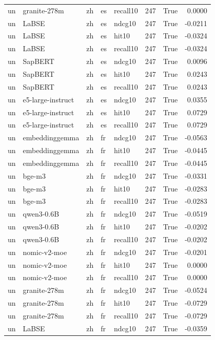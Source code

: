 \begin{tabular}{lllllrrr}
un & granite-278m & zh & es & recall10 & 247 & True & 0.0000 \\
un & LaBSE & zh & es & ndcg10 & 247 & True & -0.0211 \\
un & LaBSE & zh & es & hit10 & 247 & True & -0.0324 \\
un & LaBSE & zh & es & recall10 & 247 & True & -0.0324 \\
un & SapBERT & zh & es & ndcg10 & 247 & True & 0.0096 \\
un & SapBERT & zh & es & hit10 & 247 & True & 0.0243 \\
un & SapBERT & zh & es & recall10 & 247 & True & 0.0243 \\
un & e5-large-instruct & zh & es & ndcg10 & 247 & True & 0.0355 \\
un & e5-large-instruct & zh & es & hit10 & 247 & True & 0.0729 \\
un & e5-large-instruct & zh & es & recall10 & 247 & True & 0.0729 \\
un & embeddinggemma & zh & fr & ndcg10 & 247 & True & -0.0563 \\
un & embeddinggemma & zh & fr & hit10 & 247 & True & -0.0445 \\
un & embeddinggemma & zh & fr & recall10 & 247 & True & -0.0445 \\
un & bge-m3 & zh & fr & ndcg10 & 247 & True & -0.0331 \\
un & bge-m3 & zh & fr & hit10 & 247 & True & -0.0283 \\
un & bge-m3 & zh & fr & recall10 & 247 & True & -0.0283 \\
un & qwen3-0.6B & zh & fr & ndcg10 & 247 & True & -0.0519 \\
un & qwen3-0.6B & zh & fr & hit10 & 247 & True & -0.0202 \\
un & qwen3-0.6B & zh & fr & recall10 & 247 & True & -0.0202 \\
un & nomic-v2-moe & zh & fr & ndcg10 & 247 & True & -0.0201 \\
un & nomic-v2-moe & zh & fr & hit10 & 247 & True & 0.0000 \\
un & nomic-v2-moe & zh & fr & recall10 & 247 & True & 0.0000 \\
un & granite-278m & zh & fr & ndcg10 & 247 & True & -0.0524 \\
un & granite-278m & zh & fr & hit10 & 247 & True & -0.0729 \\
un & granite-278m & zh & fr & recall10 & 247 & True & -0.0729 \\
un & LaBSE & zh & fr & ndcg10 & 247 & True & -0.0359 \\

\end{tabular}
